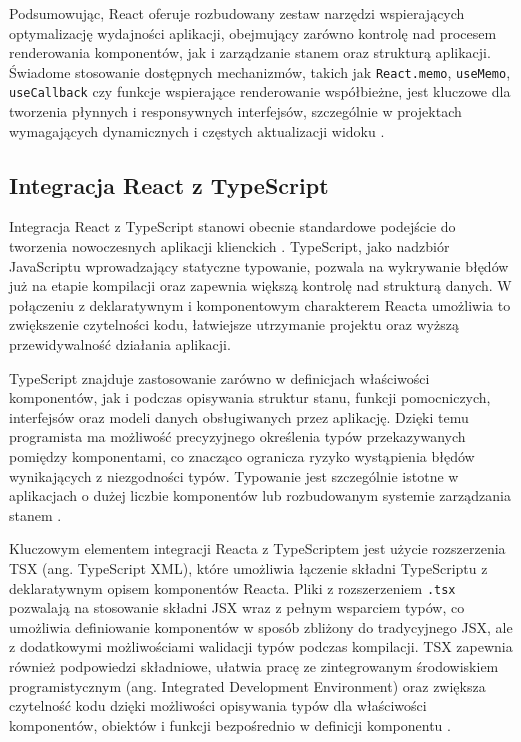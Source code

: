 \documentclass[12pt,openright,twoside]{report}
\begin{document}
Podsumowując, React oferuje rozbudowany zestaw narzędzi wspierających optymalizację wydajności aplikacji, obejmujący zarówno kontrolę nad procesem renderowania komponentów, jak i zarządzanie stanem oraz strukturą aplikacji. Świadome stosowanie dostępnych mechanizmów, takich jak \texttt{React.memo}, \texttt{useMemo}, \texttt{useCallback} czy funkcje wspierające renderowanie współbieżne, jest kluczowe dla tworzenia płynnych i responsywnych interfejsów, szczególnie w projektach wymagających dynamicznych i częstych aktualizacji widoku \cite{High_Perf_JS}.
\subsection{Integracja React z TypeScript}
Integracja React z TypeScript stanowi obecnie standardowe podejście do tworzenia nowoczesnych aplikacji klienckich \cite{Learning_TS}. TypeScript, jako nadzbiór JavaScriptu wprowadzający statyczne typowanie, pozwala na wykrywanie błędów już na etapie kompilacji oraz zapewnia większą kontrolę nad strukturą danych. W połączeniu z deklaratywnym i komponentowym charakterem Reacta umożliwia to zwiększenie czytelności kodu, łatwiejsze utrzymanie projektu oraz wyższą przewidywalność działania aplikacji.

TypeScript znajduje zastosowanie zarówno w definicjach właściwości komponentów, jak i podczas opisywania struktur stanu, funkcji pomocniczych, interfejsów oraz modeli danych obsługiwanych przez aplikację. Dzięki temu programista ma możliwość precyzyjnego określenia typów przekazywanych pomiędzy komponentami, co znacząco ogranicza ryzyko wystąpienia błędów wynikających z niezgodności typów. Typowanie jest szczególnie istotne w aplikacjach o dużej liczbie komponentów lub rozbudowanym systemie zarządzania stanem \cite{Effective_TS}.

Kluczowym elementem integracji Reacta z TypeScriptem jest użycie rozszerzenia TSX (ang. TypeScript XML), które umożliwia łączenie składni TypeScriptu z deklaratywnym opisem komponentów Reacta. Pliki z rozszerzeniem \texttt{.tsx} pozwalają na stosowanie składni JSX wraz z pełnym wsparciem typów, co umożliwia definiowanie komponentów w sposób zbliżony do tradycyjnego JSX, ale z dodatkowymi możliwościami walidacji typów podczas kompilacji. TSX zapewnia również podpowiedzi składniowe, ułatwia pracę ze zintegrowanym środowiskiem programistycznym (ang. Integrated Development Environment) oraz zwiększa czytelność kodu dzięki możliwości opisywania typów dla właściwości komponentów, obiektów i funkcji bezpośrednio w definicji komponentu \cite{TypeScript_Official}.
\end{document}
